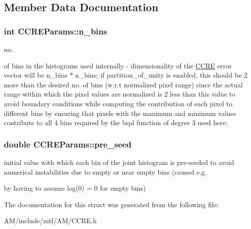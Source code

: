 \subsection{Member Data Documentation}
\hypertarget{structCCREParams_afeb767eb97c56f06a0b1953a741fffa2}{
\subsubsection[{n\-\_\-bins}]{\setlength{\rightskip}{0pt plus 5cm}int C\-C\-R\-E\-Params\-::n\-\_\-bins}}\label{structCCREParams_afeb767eb97c56f06a0b1953a741fffa2}


no. 

of bins in the histograms used internally -\/ dimensionality of the \hyperlink{classCCRE}{C\-C\-R\-E} error vector will be n\-\_\-bins $\ast$ n\-\_\-bins; if partition\-\_\-of\-\_\-unity is enabled, this should be 2 more than the desired no. of bins (w.\-r.\-t normalized pixel range) since the actual range within which the pixel values are normalized is 2 less than this value to avoid boundary conditions while computing the contribution of each pixel to different bins by ensuring that pixels with the maximum and minimum values contribute to all 4 bins required by the bspl function of degree 3 used here; \hypertarget{structCCREParams_a17d4136ef6a1c8aae61b286531b75846}{
\subsubsection[{pre\-\_\-seed}]{\setlength{\rightskip}{0pt plus 5cm}double C\-C\-R\-E\-Params\-::pre\-\_\-seed}}\label{structCCREParams_a17d4136ef6a1c8aae61b286531b75846}


initial value with which each bin of the joint histogram is pre-\/seeded to avoid numerical instabilities due to empty or near empty bins (caused e.\-g. 

by having to assume log(0) = 0 for empty bins) 

The documentation for this struct was generated from the following file\-:\begin{DoxyCompactItemize}
\item 
A\-M/include/mtf/\-A\-M/C\-C\-R\-E.\-h\end{DoxyCompactItemize}
